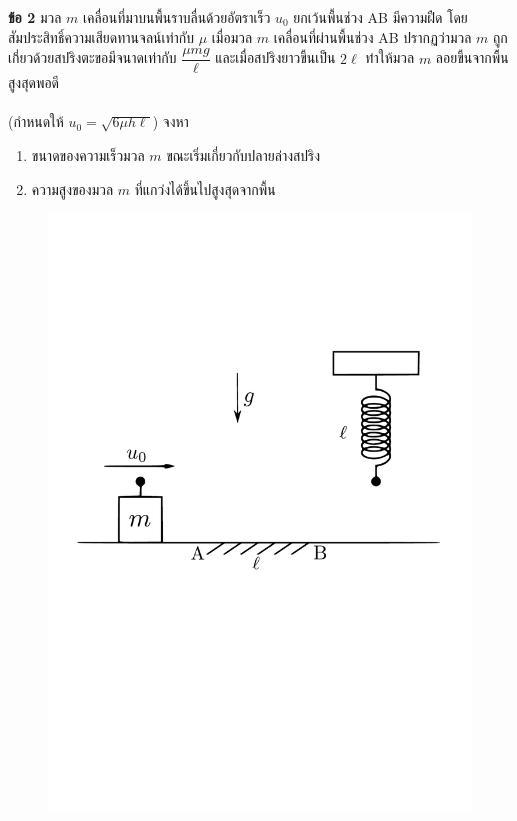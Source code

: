 \documentclass[a4paper,12pt]{article}
\begin{document}
\noindent\textbf{ข้อ 2} มวล \(m\) เคลื่อนที่มาบนพื้นราบลื่นด้วยอัตราเร็ว \(u_0\) ยกเว้นพื้นช่วง AB มีความฝืด โดยสัมประสิทธิ์ความเสียดทานจลน์เท่ากับ \(\mu\) เมื่อมวล \(m\) เคลื่อนที่ผ่านพื้นช่วง AB ปรากฏว่ามวล \(m\) ถูกเกี่ยวด้วยสปริงตะขอมีจนาดเท่ากับ \(\dfrac{\mu mg}{\ell}\) และเมื่อสปริงยาวขึ้นเป็น \(2\ell\) ทำให้มวล \(m\) ลอยขึ้นจากพื้นสูงสุดพอดี\\\\
(กำหนดให้ \(u_0=\sqrt{6\mu h\ell}\)) จงหา
\begin{enumerate}
	\item ขนาดของความเร็วมวล \(m\) ขณะเริ่มเกี่ยวกับปลายล่างสปริง
	\item ความสูงของมวล \(m\) ที่แกว่งได้ขึ้นไปสูงสุดจากพื้น
\end{enumerate}
\begin{figure}[h]
	\centering
	\includegraphics[width=0.5\linewidth]{problem1}
\end{figure}
\end{document}
